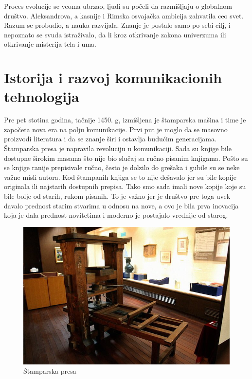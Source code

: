 \documentclass[10pt]{article}
\begin{document}
	Proces evolucije se veoma ubrzao, ljudi su počeli da razmišljaju o globalnom društvo.  Aleksandrova, a kasnije i Rimska osvajačka ambicija zahvatila ceo svet. Razum se probudio, a nauka razvijala.  Znanje je postalo samo po sebi cilj, i nepoznato se svuda istraživalo, da li kroz otkrivanje zakona univerzuma ili otkrivanje misterija tela i uma.
    
    \section{Istorija i razvoj komunikacionih tehnologija}
    
    Pre pet stotina godina, tačnije 1450. g, izmišljena je štamparska mašina i time je započeta nova era na polju komunikacije. Prvi put je moglo da se masovno proizvodi literatura i da se znanje širi i ostavlja budućim generacijama. Štamparska presa je napravila revoluciju u komunikaciji. Sada su knjige bile dostupne širokim masama što nije bio slučaj sa ručno pisanim knjigama. Pošto su se knjige ranije prepisivale ručno, često je dolzilo do grešaka i gubile su se neke važne misli autora. Kod štampanih knjiga se to nije dešavalo jer su bile kopije originala ili najstarih dostupnih prepisa. Tako smo sada imali nove kopije koje su bile bolje od starih, rukom pisanih. To je važno jer je društvo pre toga uvek davalo prednost starim stvarima u odnosu na nove, a ovo je bila prva inovacija koja je dala prednost novitetima i moderno je postajalo vrednije od starog.
    
\begin{figure}
    \centering
    \includegraphics[scale=0.4]{stamparska-presa.jpg}
    \caption{Štamparska presa}
\end{figure}
\end{document}
